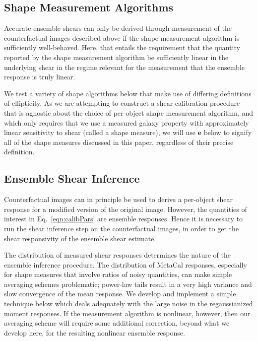 \documentclass[iop]{emulateapj}
\newcommand\rmcomment[1]{\textcolor{red}{(RM: #1)}}
\begin{document}
\subsection{Shape Measurement Algorithms}
\label{subsec:shapemeas}
Accurate ensemble shears can only be derived through measurement of
the counterfactual images described above if the shape measurement
algorithm is sufficiently well-behaved. Here, that entails the
requirement that the quantity reported by the shape measurement
algorithm be sufficiently linear in the underlying shear in the regime
relevant for the measurement that the ensemble response is truly
linear.


We test a variety of shape algorithms below that make use of differing
definitions of ellipticity. As we are attempting to construct a shear
calibration procedure that is agnostic about the choice of per-object
shape measurement algorithm, and which only requires that we use a
measured galaxy property with approximately linear sensitivity to
shear (called a shape measure), we will use $\mathbf{e}$ below to
signify all of the shape measures discussed in this paper, regardless
of their precise definition.

\subsection{Ensemble Shear Inference}
Counterfactual images can in principle be used to derive a per-object
shear response for a modified version of the original image.  However,
the quantities of interest in Eq.~\ref{eqn:calibPars} are ensemble
responses.  Hence it is necessary to run the shear inference
step on the counterfactual images, in order to get the shear
responsivity of the ensemble shear estimate.

The distribution of measured shear responses determines the nature of
the ensemble inference procedure. The distribution of MetaCal
responses, especially for shape measures that involve ratios of noisy
quantities, can make simple averaging schemes problematic; power-law
tails result in a very high variance and slow convergence of the mean
response. We develop and implement a simple technique below which
deals adequately with the large noise in the regaussianized moment
responses. If the measurement algorithm is nonlinear, however, then
our averaging scheme will require some additional correction, beyond
what we develop here, for the resulting nonlinear ensemble response.
\end{document}
